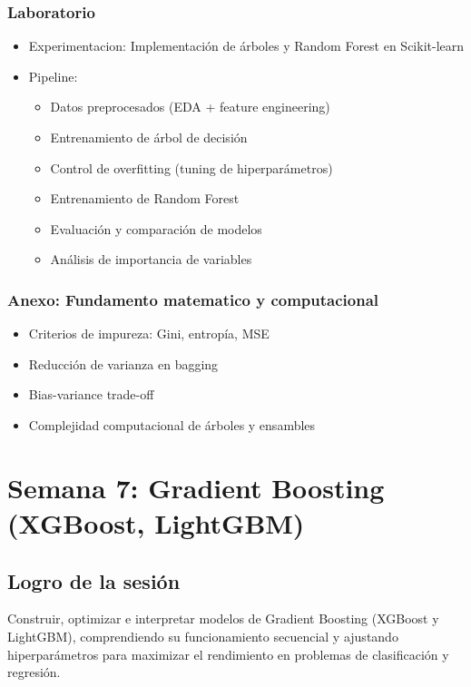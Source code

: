 \documentclass[12pt,a4paper,openany,oneside]{book}
\begin{document}
\begin{itemize}
\subsection{Laboratorio}
\begin{itemize}
    \item Experimentacion: Implementación de árboles y Random Forest en Scikit-learn
    \item Pipeline:
    \begin{itemize}
        \item Datos preprocesados (EDA + feature engineering)
        \item Entrenamiento de árbol de decisión
        \item Control de overfitting (tuning de hiperparámetros)
        \item Entrenamiento de Random Forest
        \item Evaluación y comparación de modelos
        \item Análisis de importancia de variables
    \end{itemize}
\end{itemize}

\subsection{Anexo: Fundamento matematico y computacional}
\begin{itemize}
    \item Criterios de impureza: Gini, entropía, MSE
    \item Reducción de varianza en bagging
    \item Bias-variance trade-off
    \item Complejidad computacional de árboles y ensambles
\end{itemize}

\chapter{Semana 7: Gradient Boosting (XGBoost, LightGBM)}

\section{Logro de la sesión}
Construir, optimizar e interpretar modelos de Gradient Boosting (XGBoost y LightGBM), comprendiendo su funcionamiento secuencial y ajustando hiperparámetros para maximizar el rendimiento en problemas de clasificación y regresión.


\end{itemize}
\end{document}
